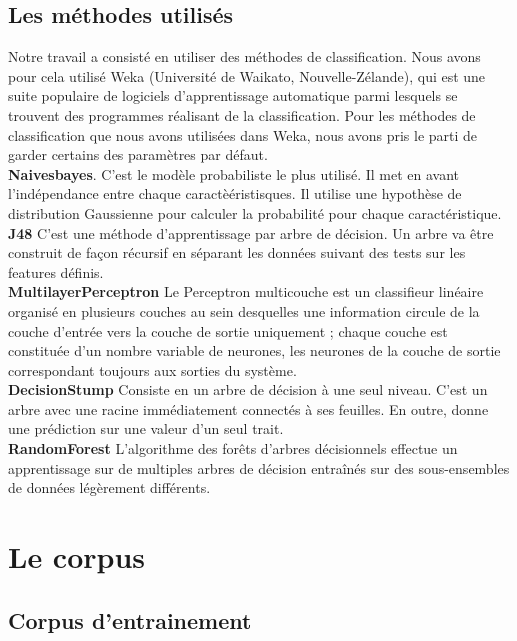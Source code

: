 \documentclass[10pt,a4paper,twoside]{article}
\begin{document}
\subsection{Les méthodes utilisés}
\label{methode}
Notre travail a consisté en utiliser des méthodes de classification. Nous avons pour cela utilisé Weka (Université de Waikato, Nouvelle-Zélande), qui est une suite populaire de logiciels d'apprentissage automatique parmi lesquels se trouvent des programmes réalisant de la classification.
Pour les méthodes de classification que nous avons utilisées dans Weka, nous avons pris le parti de garder certains des paramètres par défaut. \\
\textbf{Naivesbayes}. C'est le modèle probabiliste le plus utilisé. Il met en avant l'indépendance entre chaque caractèéristisques. Il utilise une hypothèse de distribution Gaussienne pour calculer la probabilité pour chaque caractéristique.\\
\textbf{J48} C'est une méthode d'apprentissage par arbre de décision. Un arbre va être construit de façon récursif en séparant les données suivant des tests sur les features définis.  \\
\textbf{MultilayerPerceptron} Le Perceptron multicouche est un classifieur linéaire organisé en plusieurs couches au sein desquelles une information circule de la couche d'entrée vers la couche de sortie uniquement ; chaque couche est constituée d'un nombre variable de neurones, les neurones de la couche de sortie correspondant toujours aux sorties du système.\\
\textbf{DecisionStump} Consiste en un arbre de décision à une seul niveau. C'est un arbre avec une racine immédiatement connectés à ses feuilles. En outre, donne une prédiction sur une valeur d'un seul trait.\\
\textbf{RandomForest} L'algorithme des forêts d'arbres décisionnels effectue un apprentissage sur de multiples arbres de décision entraînés sur des sous-ensembles de données légèrement différents.


\section{Le corpus}
\label{corpus}
\subsection{Corpus d'entrainement}
\end{document}
